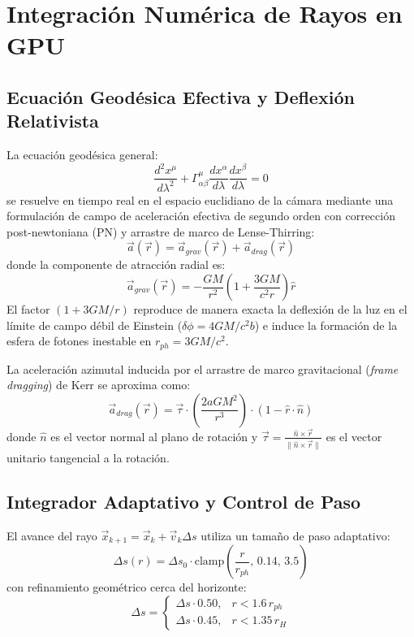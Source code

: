 \documentclass[10pt,twocolumn,a4paper]{article}
\begin{document}
\section{Integración Numérica de Rayos en GPU}

\subsection{Ecuación Geodésica Efectiva y Deflexión Relativista}
La ecuación geodésica general:
\begin{equation}
\frac{d^2 x^\mu}{d\lambda^2} + \Gamma^\mu_{\alpha\beta} \frac{dx^\alpha}{d\lambda} \frac{dx^\beta}{d\lambda} = 0
\end{equation}
se resuelve en tiempo real en el espacio euclidiano de la cámara mediante una formulación de campo de aceleración efectiva de segundo orden con corrección post-newtoniana (PN) y arrastre de marco de Lense-Thirring:
\begin{equation}
\vec{a}(\vec{r}) = \vec{a}_{grav}(\vec{r}) + \vec{a}_{drag}(\vec{r})
\end{equation}
donde la componente de atracción radial es:
\begin{equation}
\vec{a}_{grav}(\vec{r}) = -\frac{GM}{r^2} \left(1 + \frac{3GM}{c^2 r}\right) \hat{r}
\end{equation}
El factor $(1 + 3GM/r)$ reproduce de manera exacta la deflexión de la luz en el límite de campo débil de Einstein ($\delta\phi = 4GM/c^2 b$) e induce la formación de la esfera de fotones inestable en $r_{ph} = 3GM/c^2$.

La aceleración azimutal inducida por el arrastre de marco gravitacional (\textit{frame dragging}) de Kerr se aproxima como:
\begin{equation}
\vec{a}_{drag}(\vec{r}) = \vec{\tau} \cdot \left(\frac{2 a G M^2}{r^3}\right) \cdot (1 - \hat{r}\cdot\hat{n})
\end{equation}
donde $\hat{n}$ es el vector normal al plano de rotación y $\vec{\tau} = \frac{\hat{n} \times \vec{r}}{\|\hat{n} \times \vec{r}\|}$ es el vector unitario tangencial a la rotación.

\subsection{Integrador Adaptativo y Control de Paso}
El avance del rayo $\vec{x}_{k+1} = \vec{x}_k + \vec{v}_k \Delta s$ utiliza un tamaño de paso adaptativo:
\begin{equation}
\Delta s(r) = \Delta s_0 \cdot \text{clamp}\left(\frac{r}{r_{ph}},\, 0.14,\, 3.5\right)
\end{equation}
con refinamiento geométrico cerca del horizonte:
\begin{equation}
\Delta s = 
\begin{cases}
\Delta s \cdot 0.50, & r < 1.6\, r_{ph} \\
\Delta s \cdot 0.45, & r < 1.35\, r_H
\end{cases}
\end{equation}
\end{document}
